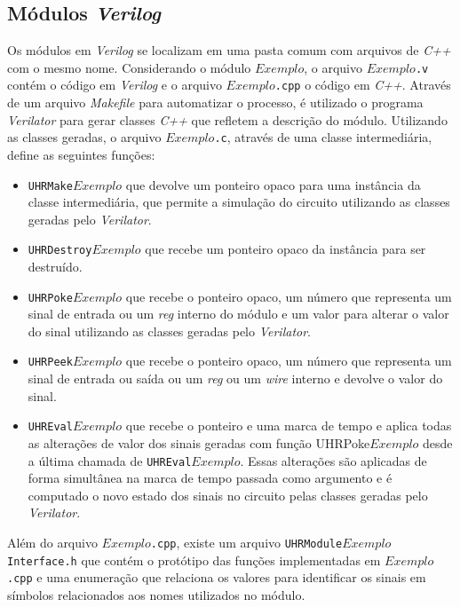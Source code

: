 \subsection{Módulos \emph{Verilog}}
\label{ssec:mverilog}

Os módulos em \emph{Verilog} se localizam em uma pasta comum com arquivos de \emph{C++} com o mesmo nome.
Considerando o módulo $Exemplo$, o arquivo \texttt{$Exemplo$.v} contém o código em \emph{Verilog} e o
arquivo \texttt{$Exemplo$.cpp} o código em \emph{C++}. Através de um arquivo \emph{Makefile} \citep{make} 
para automatizar o processo, é utilizado o programa \emph{Verilator} para gerar classes \emph{C++} que 
refletem a descrição do módulo. Utilizando as classes geradas, o arquivo \texttt{$Exemplo$.c}, através de uma
classe intermediária, define as seguintes funções:

\begin{itemize}
  \item \texttt{UHRMake$Exemplo$} que devolve um ponteiro opaco para uma instância da classe intermediária, que permite a simulação
        do circuito utilizando as classes geradas pelo \emph{Verilator}.
  \item \texttt{UHRDestroy$Exemplo$} que recebe um ponteiro opaco da instância para ser destruído.
  \item \texttt{UHRPoke$Exemplo$} que recebe o ponteiro opaco, um número que representa um sinal de entrada ou um \emph{reg} interno do módulo e um valor para
        alterar o valor do sinal utilizando as classes geradas pelo \emph{Verilator}.
  \item \texttt{UHRPeek$Exemplo$} que recebe o ponteiro opaco, um número que representa um sinal de entrada ou saída ou um \emph{reg} ou um \emph{wire} interno e 
        devolve o valor do sinal.
  \item \texttt{UHREval$Exemplo$} que recebe o ponteiro e uma marca de tempo e aplica todas as alterações de valor dos sinais geradas com função UHRPoke$Exemplo$ desde a última chamada
        de \texttt{UHREval$Exemplo$}. Essas alterações são aplicadas de forma simultânea na marca de tempo passada como argumento e é computado o novo estado dos 
        sinais no circuito pelas classes geradas pelo \emph{Verilator}.
\end{itemize}

Além do arquivo \texttt{$Exemplo$.cpp}, existe um arquivo \texttt{UHRModule$Exemplo$Interface.h} que contém o protótipo das funções
implementadas em \texttt{$Exemplo$.cpp} e uma enumeração que relaciona os valores para identificar os sinais em símbolos relacionados 
aos nomes utilizados no módulo.

